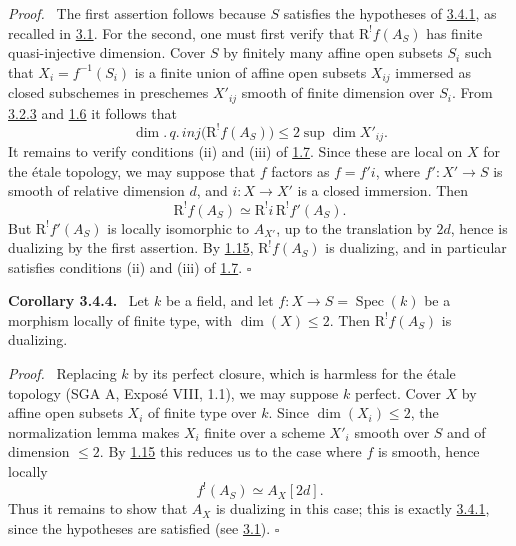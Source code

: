\documentclass[11pt]{article}
\providecommand{\qedtext}{\hfill$\square$}
\newenvironment{statement}[1]{\par\medskip\noindent\textbf{#1.}\ }{\par\medskip}
\newenvironment{prooftext}[1][Proof]{\par\noindent\emph{#1.}\ }{\par\medskip}
\DeclareMathOperator{\Spec}{Spec}
\newcommand{\R}{\mathrm{R}}
\providecommand{\R}{\mathrm R}
\providecommand{\Spec}{\operatorname{Spec}}
\providecommand{\Spec}{\operatorname{Spec}}
\providecommand{\Spec}{\operatorname{Spec}}
\providecommand{\qedtext}{\hfill$\square$}
\providecommand{\Spec}{\operatorname{Spec}}
\begin{document}
\begin{prooftext}
The first assertion follows because $S$ satisfies the hypotheses of \hyperref[sga5:I:theorem:3.4.1]{3.4.1}, as recalled in \hyperref[sga5:I:subsection:3.1]{3.1}. For the second, one must first verify that $\R^!f(A_S)$ has finite quasi-injective dimension. Cover $S$ by finitely many affine open subsets $S_i$ such that $X_i=f^{-1}(S_i)$ is a finite union of affine open subsets $X_{ij}$ immersed as closed subschemes in preschemes $X'_{ij}$ smooth of finite dimension over $S_i$. From \hyperref[sga5:I:corollary:3.2.3]{3.2.3} and \hyperref[sga5:I:proposition:1.6]{1.6} it follows that
\[
   \dim.\,q.\,inj\bigl(\R^!f(A_S)\bigr)
       \le 2\sup \dim X'_{ij}.
\]
It remains to verify conditions (ii) and (iii) of \hyperref[sga5:I:definition:1.7]{1.7}. Since these are local on $X$ for the étale topology, we may suppose that $f$ factors as $f=f'i$, where $f':X'\to S$ is smooth of relative dimension $d$, and $i:X\to X'$ is a closed immersion. Then
\[
   \R^!f(A_S)\simeq \R^!i\,\R^!f'(A_S).
\]
But $\R^!f'(A_S)$ is locally isomorphic to $A_{X'}$, up to the translation by $2d$, hence is dualizing by the first assertion. By \hyperref[sga5:I:corollary:1.15]{1.15}, $\R^!f(A_S)$ is dualizing, and in particular satisfies conditions (ii) and (iii) of \hyperref[sga5:I:definition:1.7]{1.7}. \qedtext
\end{prooftext}

\label{sga5:I:corollary:3.4.4}\begin{statement}{Corollary 3.4.4}
Let $k$ be a field, and let $f:X\to S=\Spec(k)$ be a morphism locally of finite type, with $\dim(X)\le2$. Then $\R^!f(A_S)$ is dualizing.
\end{statement}

\begin{prooftext}
Replacing $k$ by its perfect closure, which is harmless for the étale topology (SGA A, Exposé VIII, 1.1), we may suppose $k$ perfect. Cover $X$ by affine open subsets $X_i$ of finite type over $k$. Since $\dim(X_i)\le2$, the normalization lemma makes $X_i$ finite over a scheme $X'_i$ smooth over $S$ and of dimension $\le2$. By \hyperref[sga5:I:corollary:1.15]{1.15} this reduces us to the case where $f$ is smooth, hence locally
\[
   f^!(A_S)\simeq A_X[2d].
\]
Thus it remains to show that $A_X$ is dualizing in this case; this is exactly \hyperref[sga5:I:theorem:3.4.1]{3.4.1}, since the hypotheses are satisfied (see \hyperref[sga5:I:subsection:3.1]{3.1}). \qedtext
\end{prooftext}
\end{document}

